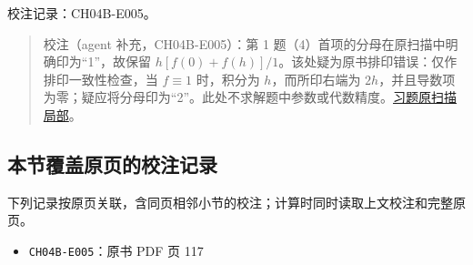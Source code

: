 \documentclass[
  10pt,
  fontset=fandol]{ctexart}
\providecommand{\tightlist}{%
  \setlength{\itemsep}{0pt}\setlength{\parskip}{0pt}}
\begin{document}
校注记录：CH04B-E005。

\begin{quote}
校注（agent 补充，CH04B-E005）：第 1 题（4）首项的分母在原扫描中明确印为``1''，故保留 \(h[f(0)+f(h)]/1\)。该处疑为原书排印错误：仅作排印一致性检查，当 \(f\equiv1\) 时，积分为 \(h\)，而所印右端为 \(2h\)，并且导数项为零；疑应将分母印为``2''。此处不求解题中参数或代数精度。\href{../assets/ch04b/review-p117-exercises.png}{习题原扫描局部}。
\end{quote}

\subsection{本节覆盖原页的校注记录}\label{ux672cux8282ux8986ux76d6ux539fux9875ux7684ux6821ux6ce8ux8bb0ux5f55}

下列记录按原页关联，含同页相邻小节的校注；计算时同时读取上文校注和完整原页。

\begin{itemize}
\tightlist
\item
  \texttt{CH04B-E005}：原书 PDF 页 117
\end{itemize}
\end{document}
